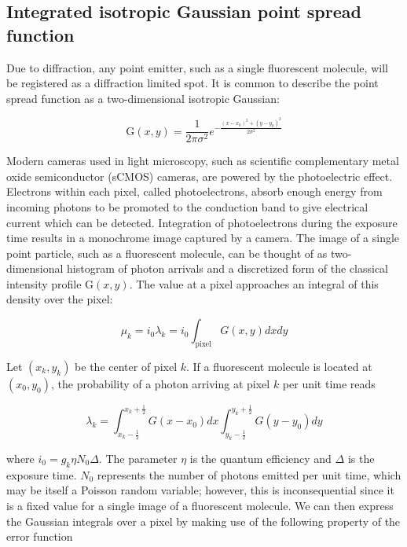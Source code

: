 \documentclass{ucetd}
\begin{document}
\subsection{Integrated isotropic Gaussian point spread function}

Due to diffraction, any point emitter, such as a single fluorescent molecule, will be registered as a diffraction limited spot. It is common to describe the point spread function as a two-dimensional isotropic Gaussian:

\begin{equation*}
\mathrm{G}(x,y) = \frac{1}{2\pi\sigma^{2}}e^{-\frac{(x-x_{0})^{2}+(y-y_{0})^{2}}{2\sigma^{2}}}
\end{equation*}

Modern cameras used in light microscopy, such as scientific complementary metal oxide semiconductor (sCMOS) cameras, are powered by the photoelectric effect. Electrons within each pixel, called photoelectrons, absorb enough energy from incoming photons to be promoted to the conduction band to give electrical current which can be detected. Integration of photoelectrons during the exposure time results in a monochrome image captured by a camera. The image of a single point particle, such as a fluorescent molecule, can be thought of as two-dimensional histogram of photon arrivals and a discretized form of the classical intensity profile $\mathrm{G}(x,y)$. The value at a pixel approaches an integral of this density over the pixel:

\begin{equation}
\mu_{k} = i_{0}\lambda_{k} = i_{0}\int_{\mathrm{pixel}} G(x,y)dxdy
\end{equation}

Let $(x_{k},y_{k})$ be the center of pixel $k$. If a fluorescent molecule is located at $(x_{0},y_{0})$, the probability of a photon arriving at pixel $k$ per unit time reads

\begin{equation*}
\lambda_{k} = \int_{x_{k}-\frac{1}{2}}^{x_{k}+\frac{1}{2}}G(x-x_{0})dx \int_{y_{k}-\frac{1}{2}}^{y_{k}+\frac{1}{2}} G(y-y_{0})dy
\end{equation*}


where $i_{0} = g_{k}\eta N_{0}\Delta$. The parameter $\eta$ is the quantum efficiency and $\Delta$ is the exposure time. $N_{0}$ represents the number of photons emitted per unit time, which may be itself a Poisson random variable; however, this is inconsequential since it is a fixed value for a single image of a fluorescent molecule. We can then express the Gaussian integrals over a pixel by making use of the following property of the error function
\end{document}
